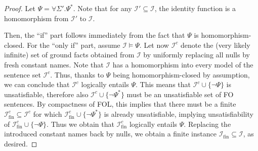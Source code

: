 \documentclass[10pt,a4paper]{amsart}
\theoremstyle{definition}
\numberwithin{equation}{section}
\theoremstyle{plain}
\theoremstyle{definition}
\theoremstyle{myexample}
\theoremstyle{plain}
\theoremstyle{definition}
\newcommand{\instance}{\mathcal{I}}
\begin{document}
\begin{proof}
Let $\Psi = \forall \Sigma'.\Psi^*$. 
Note that for any $\instance' \subseteq \instance$, the identity function is a homomorphism from $\instance'$ to $\instance$.

Then, the ``if'' part follows immediately from the fact that $\Psi$ is homomorphism-closed. For the ``only if'' part, assume $\instance \models \Psi$. Let now $\instance^c$ denote the (very likely infinite) set of ground facts obtained from $\instance$ by uniformly replacing all nulls by fresh constant names. Note that $\instance$ has a homomorphism into every model of the sentence set $\instance^c$. Thus, thanks to $\Psi$ being homomorphism-closed by assumption, we can conclude that $\instance^c$ logically entails $\Psi$.
This means that $\instance^c \cup \{\neg\Psi\}$ is unsatisfiable, therefore also $\instance^c \cup \{\neg\Psi^*\}$ must be an unsatisfiable set of FO sentences. By compactness of FOL, this implies that there must be a finite $\instance^c_\mathrm{fin} \subseteq \instance^c$ for which $\instance^c_\mathrm{fin} \cup \{\neg\Psi^*\}$ is already unsatisfiable, implying unsatisfiability of $\instance^c_\mathrm{fin} \cup \{\neg\Psi\}$. Thus we obtain that  
$\instance^c_\mathrm{fin}$ logically entails $\Psi$. Replacing the introduced constant names back by nulls, we obtain a finite instance $\instance_\mathrm{fin} \subseteq \instance$, as desired.
\end{proof}


\end{document}
